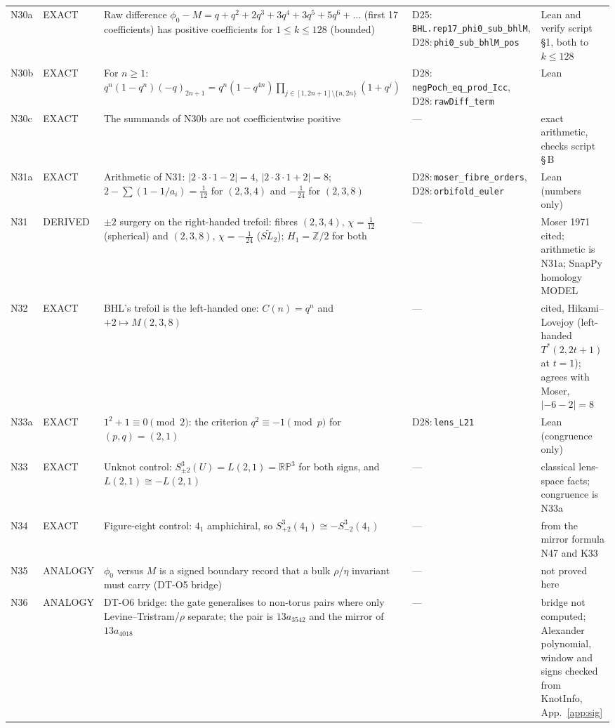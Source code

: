 \documentclass[11pt]{article}
\theoremstyle{definition}
\newcommand{\lean}[1]{\texttt{\small #1}}
\begin{document}
{\begin{longtable}{@{}L{0.05\textwidth}L{0.12\textwidth}L{0.26\textwidth}L{0.27\textwidth}L{0.17\textwidth}@{}}
N30a & EXACT & Raw difference $\phi_0-M=q+q^2+2q^3+3q^4+3q^5+5q^6+\dots$ (first 17 coefficients) has positive coefficients for $1\le k\le128$ (bounded) & D25:\,\lean{BHL.\allowbreak{}rep17\_\allowbreak{}phi0\_\allowbreak{}sub\_\allowbreak{}bhlM}, D28:\,\lean{phi0\_\allowbreak{}sub\_\allowbreak{}bhlM\_\allowbreak{}pos} & Lean and verify script \S1, both to $k\le128$\\
N30b & EXACT & For $n\ge1$: $q^n(1-q^n)(-q)_{2n+1}=q^n(1-q^{4n})\prod_{j\in[1,2n+1]\setminus\{n,2n\}}(1+q^j)$ & D28:\,\lean{negPoch\_\allowbreak{}eq\_\allowbreak{}prod\_\allowbreak{}Icc}, D28:\,\lean{rawDiff\_\allowbreak{}term} & Lean\\
N30c & EXACT & The summands of N30b are not coefficientwise positive & --- & exact arithmetic, checks script \S\,B\\
N31a & EXACT & Arithmetic of N31: $|2\cdot3\cdot1-2|=4$, $|2\cdot3\cdot1+2|=8$; $2-\sum(1-1/a_i)=\tfrac1{12}$ for $(2,3,4)$ and $-\tfrac1{24}$ for $(2,3,8)$ & D28:\,\lean{moser\_\allowbreak{}fibre\_\allowbreak{}orders}, D28:\,\lean{orbifold\_\allowbreak{}euler} & Lean (numbers only)\\
N31 & DERIVED & $\pm2$ surgery on the right-handed trefoil: fibres $(2,3,4)$, $\chi=\tfrac1{12}$ (spherical) and $(2,3,8)$, $\chi=-\tfrac1{24}$ ($\widetilde{SL_2}$); $H_1=\mathbb Z/2$ for both & --- & Moser 1971 cited; arithmetic is N31a; SnapPy homology MODEL\\
N32 & EXACT & BHL's trefoil is the left-handed one: $C(n)=q^n$ and $+2\mapsto M(2,3,8)$ & --- & cited, Hikami--Lovejoy (left-handed $T^*(2,2t+1)$ at $t=1$); agrees with Moser, $|-6-2|=8$\\
N33a & EXACT & $1^2+1\equiv0\pmod2$: the criterion $q^2\equiv-1\pmod p$ for $(p,q)=(2,1)$ & D28:\,\lean{lens\_\allowbreak{}L21} & Lean (congruence only)\\
N33 & EXACT & Unknot control: $S^3_{\pm2}(U)=L(2,1)=\mathbb{RP}^3$ for both signs, and $L(2,1)\cong-L(2,1)$ & --- & classical lens-space facts; congruence is N33a\\
N34 & EXACT & Figure-eight control: $4_1$ amphichiral, so $S^3_{+2}(4_1)\cong-S^3_{-2}(4_1)$ & --- & from the mirror formula N47 and K33\\
N35 & ANALOGY & $\phi_0$ versus $M$ is a signed boundary record that a bulk $\rho$/$\eta$ invariant must carry (DT-O5 bridge) & --- & not proved here\\
N36 & ANALOGY & DT-O6 bridge: the gate generalises to non-torus pairs where only Levine--Tristram/$\rho$ separate; the pair is $13a_{3542}$ and the mirror of $13a_{4018}$ & --- & bridge not computed; Alexander polynomial, window and signs checked from KnotInfo, App.~\ref{app:sig}\\

\end{longtable}}
\end{document}
